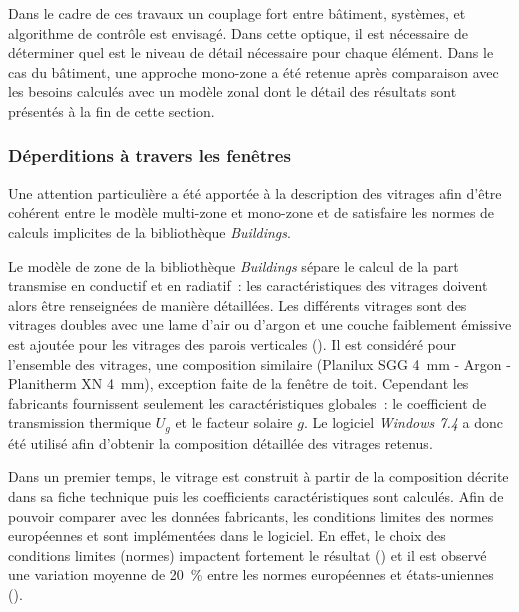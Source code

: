 Dans le cadre de ces travaux un couplage fort entre bâtiment, systèmes, et algorithme
de contrôle est envisagé. Dans cette optique, il est nécessaire de déterminer quel
est le niveau de détail nécessaire pour chaque élément. Dans le cas du bâtiment, une
approche mono-zone a été retenue après comparaison avec les besoins calculés
avec un modèle zonal dont le détail des résultats sont présentés à la fin de cette section.



\subsubsection{Déperditions à travers les fenêtres} %
\label{ssub:déperditions_à_travers_les_fenêtres}
Une attention particulière a été apportée à la description des vitrages afin
d’être cohérent entre le modèle multi-zone et mono-zone et de satisfaire les normes
de calculs implicites de la bibliothèque \textit{Buildings}.

Le modèle de zone de la bibliothèque \textit{Buildings} sépare le calcul de la part
transmise en conductif et en radiatif~: les caractéristiques des vitrages doivent alors
être renseignées de manière détaillées. Les différents vitrages sont des vitrages doubles
avec une lame d’air ou d’argon et une couche faiblement émissive est ajoutée pour les
vitrages des parois verticales (). Il est considéré pour l’ensemble
des vitrages, une composition similaire (Planilux SGG \SI{4}{mm} - Argon - Planitherm XN
\SI{4}{mm}), exception faite de la fenêtre de toit. Cependant les fabricants fournissent
seulement les caractéristiques globales~: le coefficient de transmission thermique $U_{g}$
et le facteur solaire $g$. Le logiciel \textit{Windows 7.4} a donc été utilisé afin
d’obtenir la composition détaillée des vitrages retenus.

Dans un premier temps, le vitrage est construit à partir de la composition décrite dans sa
fiche technique puis les coefficients caractéristiques sont calculés. Afin de pouvoir
comparer avec les données fabricants, les conditions limites des normes européennes
 et  sont implémentées dans le logiciel.
En effet, le choix des conditions limites (normes) impactent fortement le résultat
() et il est observé une variation moyenne de \SI{20}{\percent}
entre les normes européennes et états-uniennes ().

